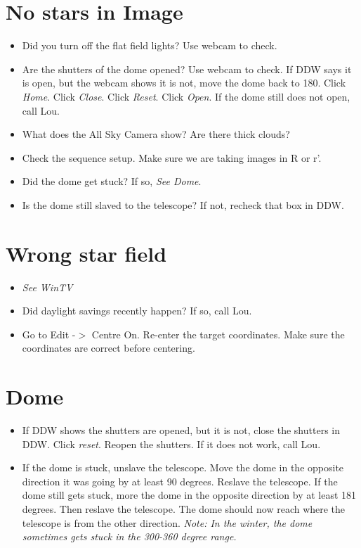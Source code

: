 \documentclass[11pt]{report}
\begin{document}
\section{No stars in Image}

\begin{itemize}
\item Did you turn off the flat field lights? Use webcam to check.
\item Are the shutters of the dome opened? Use webcam to check. If DDW says it is open, but the webcam shows it is not, move the dome back to 180. Click \emph{Home}. Click \emph{Close}. Click \emph{Reset}. Click \emph{Open}. If the dome still does not open, call Lou.
\item What does the All Sky Camera show? Are there thick clouds?
\item Check the sequence setup. Make sure we are taking images in R or r'.
\item Did the dome get stuck? If so, \emph{See Dome}.
\item Is the dome still slaved to the telescope? If not, recheck that box in DDW.
\end{itemize}

\section{Wrong star field}

\begin{itemize}
\item \emph{See WinTV}
\item Did daylight savings recently happen? If so, call Lou.
\item Go to Edit -{$>$} Centre On. Re-enter the target coordinates. Make sure the coordinates are correct before centering.
\end{itemize}

\section{Dome}
\begin{itemize}
\item If DDW shows the shutters are opened, but it is not, close the shutters in DDW. Click \emph{reset}. Reopen the shutters. If it does not work, call Lou.
\item If the dome is stuck, unslave the telescope. Move the dome in the opposite direction it was going by at least 90 degrees. Reslave the telescope. If the dome still gets stuck, more the dome in the opposite direction by at least 181 degrees. Then reslave the telescope. The dome should now reach where the telescope is from the other direction. \emph{Note: In the winter, the dome sometimes gets stuck in the 300-360 degree range.}
\end{itemize}
\end{document}
